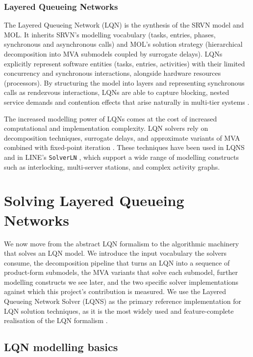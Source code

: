 \subsubsection*{Layered Queueing Networks}

The Layered Queueing Network (LQN) \cite{franks99} is the synthesis of the SRVN model and MOL. It inherits SRVN's modelling vocabulary (tasks, entries, phases, synchronous and asynchronous calls) and MOL's solution strategy (hierarchical decomposition into MVA submodels coupled by surrogate delays). LQNs explicitly represent software entities (tasks, entries, activities) with their limited concurrency and synchronous interactions, alongside hardware resources (processors). By structuring the model into layers and representing synchronous calls as rendezvous interactions, LQNs are able to capture blocking, nested service demands and contention effects that arise naturally in multi-tier systems \cite{franks99,franks2009}.

The increased modelling power of LQNs comes at the cost of increased computational and implementation complexity. LQN solvers rely on decomposition techniques, surrogate delays, and approximate variants of MVA combined with fixed-point iteration \cite{lazowska84,franks99}. These techniques have been used in LQNS \cite{franks2009} and in LINE's \texttt{SolverLN} \cite{casale2024}, which support a wide range of modelling constructs such as interlocking, multi-server stations, and complex activity graphs.




\section{Solving Layered Queueing Networks}
\label{ch:lqn}

We now move from the abstract LQN formalism to the algorithmic machinery that solves an LQN model. We introduce the input vocabulary the solvers consume, the decomposition pipeline that turns an LQN into a sequence of product-form submodels, the MVA variants that solve each submodel, further modelling constructs we see later, and the two specific solver implementations against which this project's contribution is measured. We use the Layered Queueing Network Solver (LQNS) \cite{franks2009} as the primary reference implementation for LQN solution techniques, as it is the most widely used and feature-complete realisation of the LQN formalism \cite{franks99}. 


\subsection{LQN modelling basics}
\label{sec:lqn-basics}

